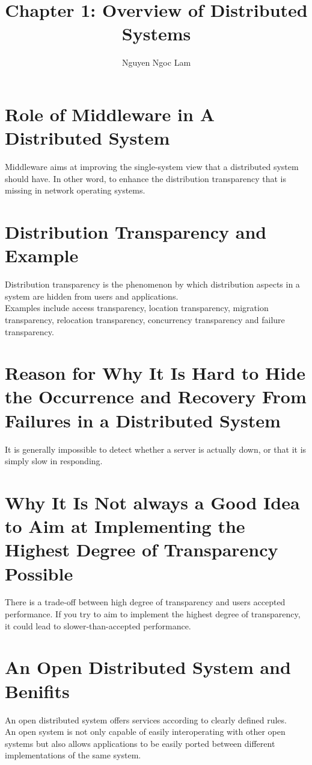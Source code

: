 \documentclass[11pt,a4paper]{article}
\title{Chapter 1: Overview of Distributed Systems}
\date{\displaydate{date}}
\author{Nguyen Ngoc Lam}
\begin{document}
  	\maketitle
  	\newpage
  	\tableofcontents
  	\newpage

  	\section{Role of Middleware in A Distributed System}
  	Middleware aims at improving the single-system view that a distributed system should have. In other word, to enhance the distribution transparency that is missing in network operating systems.
  	
  	\section{Distribution Transparency and Example}
  	Distribution transparency is the phenomenon by which distribution aspects
in a system are hidden from users and applications. \\
Examples include access transparency, location transparency, migration transparency, relocation transparency, concurrency transparency and failure transparency.

 	\section{Reason for Why It Is Hard to Hide the Occurrence and Recovery From Failures in a Distributed System}
  	It is generally impossible to detect whether a server is actually down, or
that it is simply slow in responding.

  	\section{Why It Is Not always a Good Idea to Aim at Implementing the Highest Degree of Transparency Possible}
  	There is a trade-off between high degree of transparency and users accepted performance. If you try to aim to implement the highest degree of transparency, it could lead to slower-than-accepted performance.
  	
	\section{An Open Distributed System and Benifits}
	An open distributed system offers services according to clearly defined
rules. \\
An open system is not only capable of easily interoperating with other open systems but also allows applications to be easily ported between different implementations of the same system.
\end{document}
